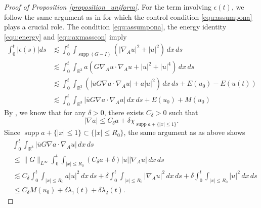 \documentclass[10pt%
]{amsart}
\numberwithin{equation}{section}
\newcommand{\R}{\mathbb{R}}
\theoremstyle{definition}
\def\supp{\mathop{\mathrm{supp}}\nolimits}
\begin{document}
\begin{proof}[Proof of Proposition \ref{proposition_uniform}]
	For the term involving $\epsilon(t)$, we follow the same argument as in \cite{LS25} for which the control condition \eqref{equ:assumpona} plays a crucial role.  The condition \eqref{equ:assumpona}, the energy identity \eqref{equ:energy} and \eqref{equ:axmasscon} imply
	\begin{align*}
		\int_0^t |\epsilon(s)|ds
		&\lesssim \int_0^t\int_{\supp(G-I)}\left(|\nabla_Au|^2+|u|^2\right)\,dx\,ds\\
		&\lesssim \int_0^t\int_{\R^3}a\left(G\nabla_Au\cdot\nabla_Au+|u|^2+|u|^4\right)\,dx\,ds\\
		&\lesssim \int_0^t\int_{\R^3}\left(|\overline uG\nabla a\cdot\nabla_Au|+a|u|^2\right)\,dx\,ds+E(u_0)-E(u(t))\\
		&\lesssim \int_0^t\int_{\R^3}|\overline uG\nabla a\cdot\nabla_Au|\,dx\,ds+E(u_0)+M(u_0)
	\end{align*}
	By  \cite[Lemma 4.4]{YNC}, we know that for any $\delta>0$, there exists $C_\delta>0$ such that
	\begin{equation}\label{equ:nablabound}
		|\nabla a|\leq C_\delta a+\delta\chi_{\supp a+\{|x|\le1\}}.
	\end{equation}
	Since $\supp a+\{|x|\le1\}\subset \{|x|\le R_0\}$, the same argument as as above shows
	\begin{align}
		\label{proof_energy_5}
		&\int_0^t\int_{\R^3}|\overline uG\nabla a\cdot\nabla_Au|\,dx\,ds\\\nonumber
		&\le  \|G\|_{L^\infty}\int_0^t\int_{|x|\le R_0}(C_\delta a+\delta)|u||\nabla_Au|\,dx\,ds\\\nonumber
		&\lesssim C_\delta\int_0^t\int_{|x|\le R_0}a|u|^2\,dx\,ds+\delta \int_0^t\int_{|x|\le R_0}|\nabla_Au|^2\,dx\,ds
		+\delta\int_0^t\int_{|x|\le R_0}|u|^2\,dx\,ds\\\nonumber
		&\le C_\delta M(u_0)+\delta \lambda_1(t)+\delta\lambda_2(t).
	\end{align}
	

\end{proof}
\end{document}
